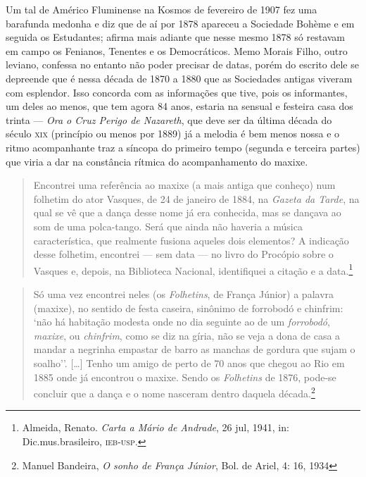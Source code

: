Um tal de Américo Fluminense na Kosmos de fevereiro de 1907 fez uma
barafunda medonha e diz que de aí por 1878 apareceu a Sociedade Bohème e
em seguida os Estudantes; afirma mais adiante que nesse mesmo 1878 só
restavam em campo os Fenianos, Tenentes e os Democráticos. Memo Morais
Filho, outro leviano, confessa no entanto não poder precisar de datas,
porém do escrito dele se depreende que é nessa década de 1870 a 1880 que as
Sociedades antigas viveram com esplendor. Isso concorda com as
informações que tive, pois os informantes, um deles ao menos, que tem
agora 84 anos, estaria na sensual e festeira casa dos trinta --- \textit{Ora
o Cruz Perigo de Nazareth}, que deve ser da última década do século \textsc{xix}
(princípio ou menos por 1889) já a melodia é bem menos nossa e o ritmo
acompanhante traz a síncopa do primeiro tempo (segunda e terceira partes) que viria a
dar na constância rítmica do acompanhamento do maxixe. %

\begin{quote}
\small{Encontrei uma referência ao maxixe (a mais antiga que conheço) num
folhetim do ator Vasques, de 24 de janeiro de 1884, na \textit{Gazeta da Tarde}, na qual
se vê que a dança desse nome já era conhecida, mas se dançava ao som de
uma polca-tango. Será que ainda não haveria a música característica, que
realmente fusiona aqueles dois elementos? A indicação desse folhetim,
encontrei --- sem data --- no livro do Procópio sobre o Vasques e, depois,
na Biblioteca Nacional, identifiquei a citação e a data.}\footnote{Almeida,
Renato. \textit{Carta a Mário de Andrade}, 26 jul, 1941, in:
Dic.mus.brasileiro, \textsc{ieb-usp}.}
\end{quote}

\begin{quote}
\small{Só uma vez encontrei neles (os \textit{Folhetins}, de França Júnior) a
palavra (maxixe), no sentido de festa caseira, sinônimo de forrobodó e
chinfrim: `não há habitação modesta onde no dia seguinte ao de um
\textit{forrobodó}, \textit{maxixe}, ou \textit{chinfrim}, como se diz na
gíria, não se veja a dona de casa a mandar a negrinha empastar de barro
as manchas de gordura que sujam o soalho''. {[}\ldots{}{]} Tenho um amigo de perto
de 70 anos que chegou ao Rio em 1885 onde já encontrou o maxixe. Sendo os
\textit{Folhetins} de 1876, pode-se concluir que a dança e o nome nasceram dentro
daquela década.}\footnote{Manuel Bandeira, \textit{O sonho de França Júnior}, Bol. de
Ariel, 4: 16, 1934}
\end{quote}

